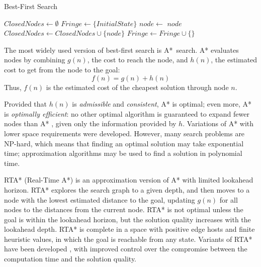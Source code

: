 \begin{algorithm}
\caption{Best-First Search}
\label{alg:bg-best-first-search}
\begin{algorithmic}[1]
\State $ClosedNodes \leftarrow \emptyset$
\State $Fringe \leftarrow \{InitialState\}$
\Loop
    \label{alg:bg-best-first-search-fringe-empty}
  \EndIf
  \State $node \leftarrow $
    \label{alg:bg-best-first-search-goal-reached}
    \Return $node$
  \EndIf
    \State $ClosedNodes \leftarrow ClosedNodes \cup \{node\}$ \label{alg:bg-best-first-search-remember-visited}
    \State $Fringe \leftarrow Fringe \cup \{$$\}$ \label{alg:bg-best-first-search-add-to-fringe}
  \EndIf
\EndLoop
\end{algorithmic}
\end{algorithm}

The most widely used version of best-first search is
A*~search. A* evaluates nodes by combining $g(n)$, the cost to
reach the node, and $h(n)$, the estimated cost to get from the node to the
goal:
\begin{equation}
\label{eq:a-star-heuristic}
f(n)=g(n)+h(n)
\end{equation}
Thus, $f(n)$ is the estimated cost of the cheapest solution through
node $n$.

Provided that $h(n)$ is {\em admissible} and {\em consistent}, A*
is optimal; even more, A* is {\em optimally efficient}: no
other optimal algorithm is guaranteed to expand fewer nodes than A*
\cite{Russell.aima}, given only the information provided by $h$.
Variations of A* with lower space requirements
were developed. However, many search problems are NP-hard, which
means that finding an optimal solution may take exponential time;
approximation algorithms may be used to find a solution in polynomial
time.

RTA* (Real-Time A*) \cite{Korf.rta} is an approximation version of A*
with limited lookahead horizon. RTA* explores the search graph to a
given depth, and then moves to a node with the lowest estimated
distance to the goal, updating $g(n)$ for all nodes to the distances
from the current node. RTA* is not optimal unless the goal is within
the lookahead horizon, but the solution quality increases with  the
lookahead depth. RTA* is complete in a space with positive edge hosts and
finite heuristic values, in which the goal is reachable from any state.
Variants of RTA* have been developed \cite{Russell.right},
\cite{Bulitko.dynamiccontrol}  with improved control over the
compromise between the computation time and the solution quality.

